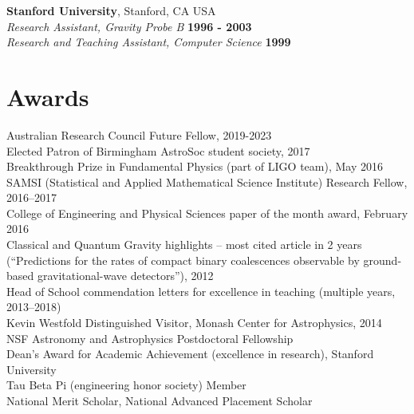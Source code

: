 \documentclass[margin,line]{res}
\begin{document}
\begin{resume}
{\bf Stanford University}, Stanford, CA USA\\
\vspace*{.02in}
{\em Research Assistant, Gravity Probe B} \hfill {\bf 1996 - 2003}\\
\vspace*{.02in}
{\em Research and Teaching Assistant, Computer Science} \hfill {\bf 1999}


\section{\sc Awards} 
Australian Research Council Future Fellow, 2019-2023\\
Elected Patron of Birmingham AstroSoc student society, 2017\\
Breakthrough Prize in Fundamental Physics (part of LIGO team), May 2016\\
SAMSI (Statistical and Applied Mathematical Science Institute) Research Fellow, 2016--2017\\
College of Engineering and Physical Sciences paper of the month award, February 2016\\
Classical and Quantum Gravity highlights -- most cited article in 2 years (``Predictions for the rates of compact binary coalescences observable by ground-based gravitational-wave detectors''), 2012\\
Head of School commendation letters for excellence in teaching (multiple years, 2013--2018)\\
Kevin Westfold Distinguished Visitor, Monash Center for Astrophysics, 2014\\
NSF Astronomy and Astrophysics Postdoctoral Fellowship\\
Dean's Award for Academic Achievement (excellence in research), Stanford University\\
Tau Beta Pi (engineering honor society) Member\\
National Merit Scholar, National Advanced Placement Scholar\\



\end{resume}
\end{document}
